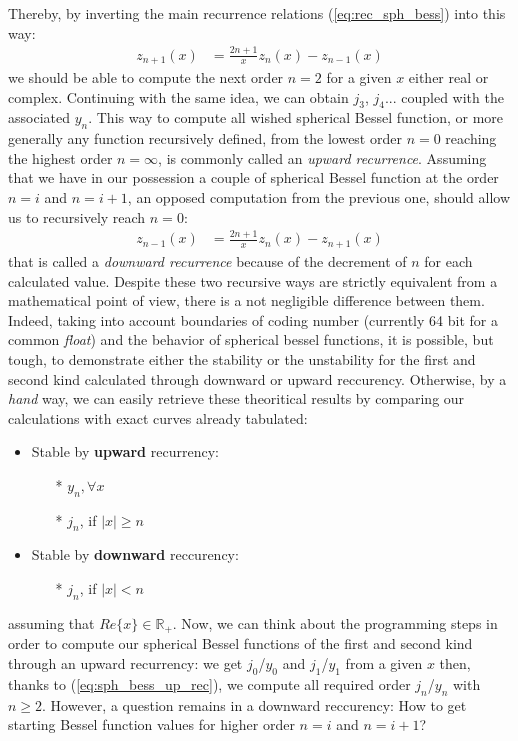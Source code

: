 \documentclass{article}
\numberwithin{equation}{section}
\begin{document}
Thereby, by inverting the main recurrence relations (\ref{eq:rec_sph_bess}) into this way:
\begin{align}\label{eq:sph_bess_up_rec}
z_{n+1}(x) &= \frac{2n+1}{x}z_{n}(x) - z_{n-1}(x)
\end{align}
we should be able to compute the next order $n=2$ for a given $x$ either real or complex. Continuing with the same idea, we can obtain $j_{3}$, $j_{4}$... coupled with the associated $y_{n}$. This way to compute all wished spherical Bessel function, or more generally any function recursively defined, from the lowest order $n=0$ reaching the highest order $n=\infty$, is commonly called an \textit{upward recurrence}. Assuming that we have in our possession a couple of spherical Bessel function at the order $n=i$ and $n=i+1$, an opposed computation from the previous one, should allow us to recursively reach $n=0$: 
\begin{align}\label{eq:sph_bess_down_rec}
z_{n-1}(x) &= \frac{2n+1}{x}z_{n}(x) - z_{n+1}(x)
\end{align}
that is called a \textit{downward recurrence} because of the decrement of $n$ for each calculated value. Despite these two recursive ways are strictly equivalent from a mathematical point of view, there is a not negligible difference between them. Indeed, taking into account boundaries of coding number (currently 64 bit for a common \textit{float}) and the behavior of spherical bessel functions, it is possible, but tough, to demonstrate either the stability or the unstability for the first and second kind calculated through downward or upward reccurency. Otherwise, by a \textit{hand} way, we can easily retrieve these theoritical results by comparing our calculations with exact curves already tabulated:
\begin{itemize}
\item Stable by \textbf{upward} recurrency: 
\begin{itemize}
\item[*]$y_{n}, \forall x$
\item[*]$j_{n}$, if $|x| \geqslant n$
\end{itemize}
\item Stable by \textbf{downward} reccurency:
\begin{itemize}
\item[*]$j_{n}$, if $|x| < n$
\end{itemize}
\end{itemize}
assuming that $Re\{x\} \in\mathbb{R}_{+}$. Now, we can think about the programming steps in order to compute our spherical Bessel functions of the first and second kind through an upward recurrency: we get $j_{0}$/$y_{0}$ and $j_{1}$/$y_{1}$ from a given $x$ then, thanks to (\ref{eq:sph_bess_up_rec}), we compute all required order $j_{n}$/$y_{n}$ with $n \geqslant 2$. However, a question remains in a downward reccurency: How to get starting Bessel function values for higher order $n=i$ and $n=i+1$?
\end{document}
